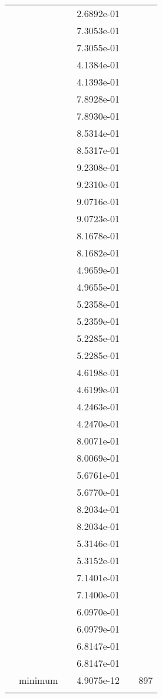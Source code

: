 \begin{xltabular}{\textwidth}{r|rS[table-format=1.3e+2]S[table-format=1.4e+2]S[table-format=1.4e+2]S[table-format=-1.5]}
&  &  & 2.6892e-01 & & \\
&  &  & 7.3053e-01 & & \\
&  &  & 7.3055e-01 & & \\
&  &  & 4.1384e-01 & & \\
&  &  & 4.1393e-01 & & \\
&  &  & 7.8928e-01 & & \\
&  &  & 7.8930e-01 & & \\
&  &  & 8.5314e-01 & & \\
&  &  & 8.5317e-01 & & \\
&  &  & 9.2308e-01 & & \\
&  &  & 9.2310e-01 & & \\
&  &  & 9.0716e-01 & & \\
&  &  & 9.0723e-01 & & \\
&  &  & 8.1678e-01 & & \\
&  &  & 8.1682e-01 & & \\
&  &  & 4.9659e-01 & & \\
&  &  & 4.9655e-01 & & \\
&  &  & 5.2358e-01 & & \\
&  &  & 5.2359e-01 & & \\
&  &  & 5.2285e-01 & & \\
&  &  & 5.2285e-01 & & \\
&  &  & 4.6198e-01 & & \\
&  &  & 4.6199e-01 & & \\
&  &  & 4.2463e-01 & & \\
&  &  & 4.2470e-01 & & \\
&  &  & 8.0071e-01 & & \\
&  &  & 8.0069e-01 & & \\
&  &  & 5.6761e-01 & & \\
&  &  & 5.6770e-01 & & \\
&  &  & 8.2034e-01 & & \\
&  &  & 8.2034e-01 & & \\
&  &  & 5.3146e-01 & & \\
&  &  & 5.3152e-01 & & \\
&  &  & 7.1401e-01 & & \\
&  &  & 7.1400e-01 & & \\
&  &  & 6.0970e-01 & & \\
&  &  & 6.0979e-01 & & \\
&  &  & 6.8147e-01 & & \\
&  &  & 6.8147e-01 & & \\
& minimum &  & 4.9075e-12 & & 897 \\  \addlinespace

\end{xltabular}
